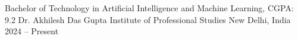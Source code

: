 
\begin{cventries}

  \cventry
    {Bachelor of Technology in Artificial Intelligence and Machine Learning, CGPA: 9.2}
    {Dr. Akhilesh Das Gupta Institute of Professional Studies}
    {New Delhi, India}
    {2024 -- Present}
    {}



\end{cventries}